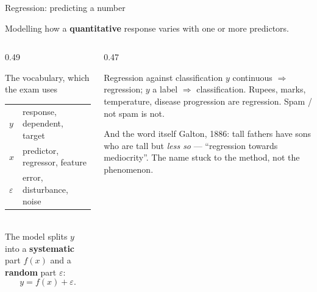 \documentclass[aspectratio=169]{beamer}
\begin{document}
\begin{frame}[shrink=6]{Regression: predicting a number}
  \begin{exampleblock}{}
    \centering\large
    Modelling how a \textbf{quantitative} response varies with one or more
    predictors.
  \end{exampleblock}
  \vspace{0.3em}
  \begin{columns}[T]
    \begin{column}{0.49\textwidth}
      \begin{block}{The vocabulary, which the exam uses}
        \small
        \begin{tabular}{@{}ll@{}}
          $y$ & response, dependent, target\\
          $x$ & predictor, regressor, feature\\
          $\varepsilon$ & error, disturbance, noise\\
        \end{tabular}\\[0.3em]
        The model splits $y$ into a \textbf{systematic} part $f(x)$ and a
        \textbf{random} part $\varepsilon$:
        \[ y = f(x) + \varepsilon. \]
      \end{block}
    \end{column}
    \begin{column}{0.47\textwidth}
      \begin{alertblock}{Regression against classification}
        \small $y$ continuous $\Rightarrow$ regression; $y$ a label
        $\Rightarrow$ classification. Rupees, marks, temperature, disease
        progression are regression. Spam / not spam is not.
      \end{alertblock}
      \begin{block}{And the word itself}
        \small Galton, 1886: tall fathers have sons who are tall but
        \emph{less so} --- ``regression towards mediocrity''. The name stuck
        to the method, not the phenomenon.
      \end{block}
    \end{column}
  \end{columns}
\end{frame}
\end{document}
